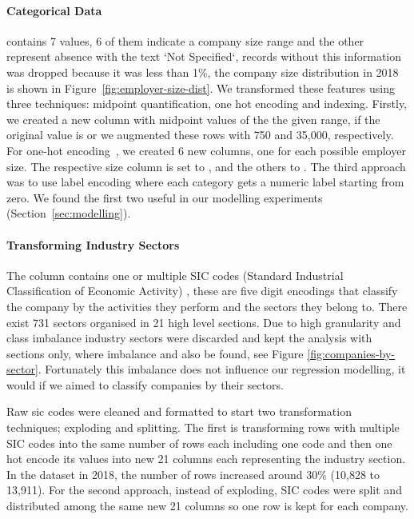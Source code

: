 \paragraph{Categorical Data} 
 contains 7 values, 6 of them indicate a company size range and the other represent absence with the text `Not Specified`, records without this information was dropped because it was less than 1\%, the company size distribution in 2018 is shown in Figure\ \ref{fig:employer-size-dist}.
We transformed these features using three techniques: midpoint quantification, one hot encoding and indexing. Firstly, we created a new column with midpoint values of the the given range, if the original value is  or  we augmented these rows with 750 and 35,000, respectively. For one-hot encoding\ \cite{pandas-get-dummies}, we created 6 new columns, one for each possible employer size. The respective size column is set to , and the others to . The third approach was to use label encoding where each category gets a numeric label starting from zero. We found the first two useful in our modelling experiments (Section\ \ref{sec:modelling}).

\paragraph{Transforming Industry Sectors}
\label{sic-agment}
The  column contains one or multiple SIC codes (Standard Industrial Classification of Economic Activity) \cite{sic-codes-2007}, these are five digit encodings that classify the company by the activities they perform and the sectors they belong to. There exist 731 sectors organised in 21 high level sections. Due to high granularity and class imbalance industry sectors were discarded and kept the analysis with sections only, where imbalance and also be found, see Figure \ref{fig:companies-by-sector}. Fortunately this imbalance does not influence our regression modelling, it would if we aimed to classify companies by their sectors. 

Raw sic codes were cleaned and formatted to start two transformation techniques; exploding and splitting. The first is transforming rows with multiple SIC codes into the same number of rows each including one code and then one hot encode its values into new 21 columns each representing the industry section. In the dataset in 2018, the number of rows increased around 30\% (10,828 to 13,911). For the second approach, instead of exploding, SIC codes were split and distributed among the same new 21 columns so one row is kept for each company.


